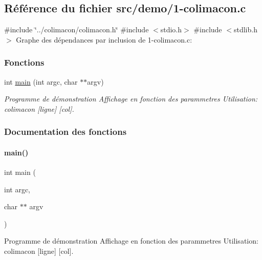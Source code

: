 \hypertarget{1-colimacon_8c}{}\subsection{Référence du fichier src/demo/1-\/colimacon.c}
\label{1-colimacon_8c}
{\ttfamily \#include \char`\"{}../colimacon/colimacon.\+h\char`\"{}}\newline
{\ttfamily \#include $<$stdio.\+h$>$}\newline
{\ttfamily \#include $<$stdlib.\+h$>$}\newline
Graphe des dépendances par inclusion de 1-\/colimacon.c\+:
\subsubsection*{Fonctions}
\begin{DoxyCompactItemize}
\item 
int \hyperlink{1-colimacon_8c_a3c04138a5bfe5d72780bb7e82a18e627}{main} (int argc, char $\ast$$\ast$argv)
\begin{DoxyCompactList}\small\item\em Programme de démonstration Affichage en fonction des parammetres Utilisation\+: colimacon \mbox{[}ligne\mbox{]} \mbox{[}col\mbox{]}. \end{DoxyCompactList}\end{DoxyCompactItemize}


\subsubsection{Documentation des fonctions}
\mbox{\label{1-colimacon_8c_a3c04138a5bfe5d72780bb7e82a18e627}} 
\paragraph{\texorpdfstring{main()}{main()}}
{\footnotesize\ttfamily int main (\begin{DoxyParamCaption}\item[{int}]{argc,  }\item[{char $\ast$$\ast$}]{argv }\end{DoxyParamCaption})}



Programme de démonstration Affichage en fonction des parammetres Utilisation\+: colimacon \mbox{[}ligne\mbox{]} \mbox{[}col\mbox{]}. 

